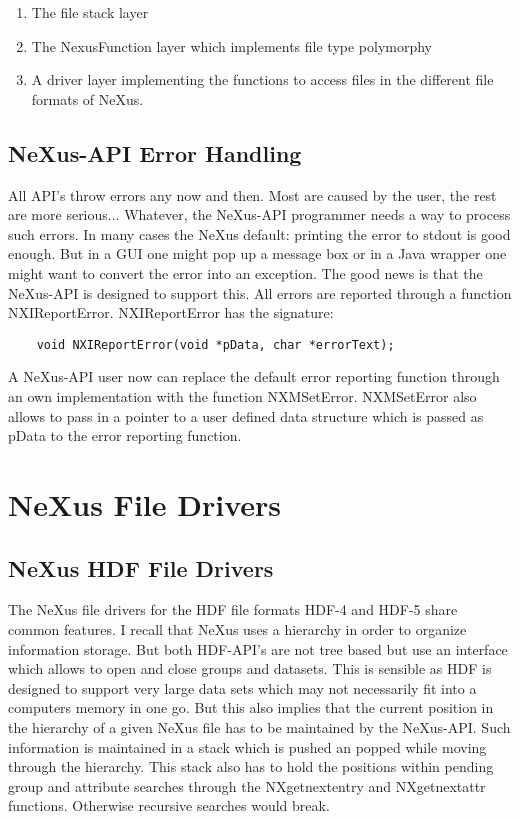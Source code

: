 \documentclass[a4paper]{article}
\begin{document}
\begin{enumerate}\item The file stack layer
\item The NexusFunction layer which implements file type polymorphy
\item A driver layer implementing the functions to access files in the different file 
 formats of NeXus. 
\end{enumerate}\subsection{NeXus-API Error Handling }
All API's throw errors any now and then. Most are caused by the user, the rest are more serious...
Whatever, the NeXus-API programmer needs a way to process such errors. In many cases the NeXus default: 
printing the error to stdout is good enough. But in a GUI one might pop up a message box or in a Java 
wrapper one might want to convert the error into an exception. The good news is that the NeXus-API is 
designed to support this. All errors are reported through a function NXIReportError. NXIReportError has 
the signature:
\begin{verbatim}
	void NXIReportError(void *pData, char *errorText);
\end{verbatim}
A NeXus-API user now can replace the default error reporting function through an own implementation with the 
function NXMSetError. NXMSetError also allows to pass in a pointer to a user defined data structure which is 
passed as pData to the error reporting function.  


\section{NeXus File Drivers }
\subsection{NeXus HDF File Drivers }
The NeXus file drivers for the HDF file formats HDF-4 and HDF-5 share common features. I recall that 
NeXus uses a hierarchy in order to organize information storage. But both HDF-API's are not tree based 
but use an interface which allows to open and close groups and datasets. This is sensible as HDF is designed 
to support very large data sets which may not necessarily fit into a computers memory in one go. But this also 
implies that the current position in the hierarchy of a given NeXus file has to be maintained by the NeXus-API.
Such information is maintained in a stack which is pushed an popped while moving through the hierarchy. This 
stack also has to hold the positions within pending group and attribute searches through the NXgetnextentry and 
NXgetnextattr functions. Otherwise recursive searches would break.  
\end{document}
